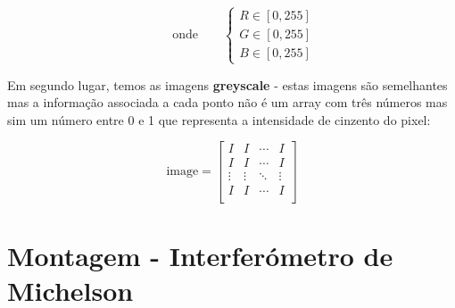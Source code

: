 \documentclass{article}
\begin{document}
\begin{multicols}{2}
\[ \qquad \text{onde} \qquad \begin{cases}
  R \in [0, 255] \\
  G \in [0, 255] \\
  B \in [0, 255]
\end{cases} \]

Em segundo lugar, temos as imagens \textbf{greyscale} - estas imagens são semelhantes mas a informação associada a cada ponto não é um array com três números mas sim um número entre 0 e 1 que representa a intensidade de cinzento do pixel:

\[ \text{image} = \begin{bmatrix}
  I & I & \cdots & I \\
  I & I & \cdots & I \\
  \vdots & \vdots & \ddots & \vdots \\
  I & I & \cdots & I \\
\end{bmatrix} \]



\end{multicols}





\newpage

\section{Montagem - Interferómetro de Michelson}

\vspace{3cm}
\end{document}
